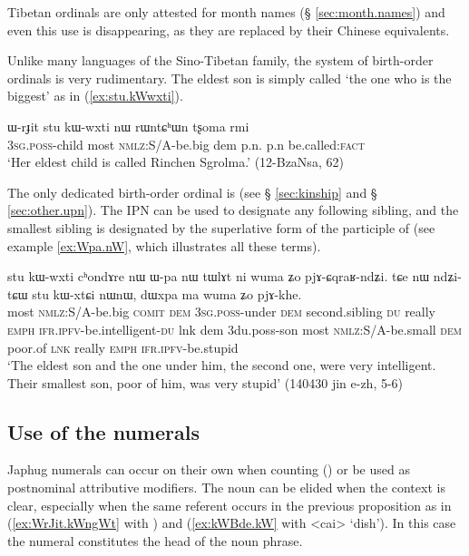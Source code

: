 Tibetan ordinals are only attested for month names (§ \ref{sec:month.names}) and even this use is disappearing, as they are replaced by their Chinese equivalents.

Unlike many languages of the Sino-Tibetan family, the system of birth-order ordinals is very rudimentary. The eldest son is simply called  `the one who is the biggest' as in (\ref{ex:stu.kWwxti}).

\begin{exe}
\ex  \label{ex:stu.kWwxti}
\gll ɯ-rɟit stu kɯ-wxti nɯ rɯntɕʰɯn tʂoma rmi\\
\textsc{3sg}.\textsc{poss}-child most \textsc{nmlz}:S/A-be.big dem p.n. p.n be.called:\textsc{fact}\\
\glt `Her eldest child is called Rinchen Sgrolma.' (12-BzaNsa, 62)
\end{exe}

The only dedicated birth-order ordinal is  (see § \ref{sec:kinship} and § \ref{sec:other.upn}). The IPN  can be used to designate any following sibling, and the smallest sibling is designated by the superlative form of the participle of  (see example \ref{ex:Wpa.nW}, which illustrates all these terms).

\begin{exe}
\ex  \label{ex:Wpa.nW}
\gll stu kɯ-wxti cʰondɤre nɯ ɯ-pa nɯ tɯlɤt ni wuma ʑo pjɤ-ɕqraʁ-ndʑi. tɕe nɯ ndʑi-tɕɯ stu kɯ-xtɕi nɯnɯ, dɯxpa ma wuma ʑo pjɤ-khe. \\
most \textsc{nmlz}:S/A-be.big \textsc{comit} \textsc{dem} \textsc{3sg}.\textsc{poss}-under \textsc{dem} second.sibling \textsc{du} really \textsc{emph} \textsc{ifr}.\textsc{ipfv}-be.intelligent-\textsc{du} lnk dem 3du.poss-son most \textsc{nmlz}:S/A-be.small \textsc{dem} poor.of \textsc{lnk} really \textsc{emph} \textsc{ifr}.\textsc{ipfv}-be.stupid \\
\glt `The eldest son and the one under him, the second one, were very intelligent. Their smallest son, poor of him, was very stupid' (140430 jin e-zh, 5-6) 
 \end{exe}

 \subsection{Use of the numerals}  \label{sec:uses.numerals}
 Japhug numerals can occur on their own when counting () or be used as postnominal attributive modifiers. The noun can be elided when the context is clear, especially when the same referent occurs in the previous proposition as in (\ref{ex:WrJit.kWngWt}  with ) and (\ref{ex:kWBde.kW} with <cai> `dish'). In this case the numeral constitutes the head of the noun phrase.

